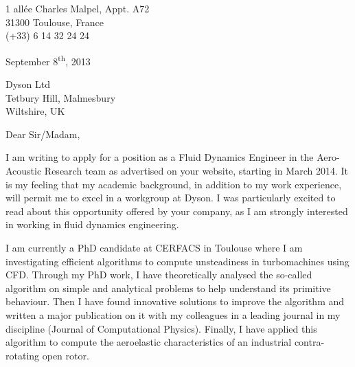 \documentclass[10pt]{article}
\begin{document}
\begin{flushright}
	1 allée Charles Malpel, Appt. A72 \\
	31300 Toulouse, France \\
	(+33) 6 14 32 24 24 \\
\end{flushright}

\begin{flushright}
September 8\textsuperscript{th}, 2013
\end{flushright}

\begin{flushleft}
Dyson Ltd \\
Tetbury Hill, Malmesbury \\
Wiltshire, UK
\end{flushleft}

\noindent
Dear Sir/Madam,
\newline

\noindent
I am writing to apply for a position as a Fluid Dynamics Engineer in the Aero-Acoustic Research team as advertised on your website, starting in March 2014. It is my feeling that my academic background, in addition to my work experience, will permit me to excel in a workgroup at Dyson. I was particularly excited to read about this opportunity offered by your company, as I am strongly interested in working in fluid dynamics engineering.
\newline

\noindent
I am currently a PhD candidate at CERFACS in Toulouse where I am investigating efficient algorithms to compute unsteadiness in turbomachines using CFD. Through my PhD work, I have theoretically analysed the so-called algorithm on simple and analytical problems to help understand its primitive behaviour. Then I have found innovative solutions to improve the algorithm and written a major publication on it with my colleagues in a leading journal in my discipline (Journal of Computational Physics). Finally, I have applied this algorithm to compute the aeroelastic characteristics of an industrial contra-rotating open rotor.
\newline
\end{document}
